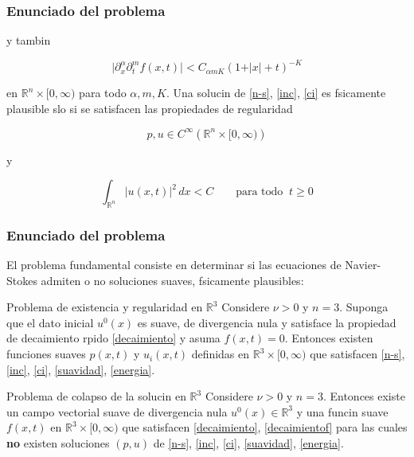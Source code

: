 \documentclass[serif,9pt]{beamer}
\begin{document}
\begin{frame}\frametitle{Enunciado del problema}
y tambin

\medskip

\begin{equation}\label{decaimientof}
\vert \partial_x^{\alpha}\partial_t^{m} f(x,t)\vert < C_{\alpha m K}\left(1 + \vert x\vert + t \right)^{-K} 
\end{equation}

\bigskip

en $\mathbb{R}^n\times [0,\infty)$ para todo $\alpha, m, K$. Una solucin de \eqref{n-s}, \eqref{inc}, \eqref{ci} es fsicamente plausible slo si se satisfacen las propiedades de regularidad

\medskip

\begin{equation}\label{suavidad}
p, u \in C^{\infty}\left(\mathbb{R}^n \times [0,\infty)\right)
\end{equation}

\medskip
y 
\medskip

\begin{equation}\label{energia}
\int_{\mathbb{R}^n} \vert u(x,t) \vert^2 \, dx < C \qquad \mbox{para todo } \ t\geq 0 
\end{equation}

\end{frame}

\begin{frame}\frametitle{Enunciado del problema}
El problema fundamental consiste en determinar si las ecuaciones de Navier-Stokes admiten o no soluciones suaves, fsicamente plausibles:

\smallskip

\begin{alertblock}{Problema de existencia y regularidad en $\mathbb{R}^3$}
Considere $\nu>0$ y $n=3$. Suponga que el dato inicial $u^0(x)$ es suave, de divergencia nula y satisface la propiedad de decaimiento rpido \eqref{decaimiento} y asuma $f(x,t)=0$. Entonces existen funciones suaves $p(x,t)$ y $u_i(x,t)$ definidas en $\mathbb{R}^3\times [0,\infty)$ que satisfacen \eqref{n-s}, \eqref{inc}, \eqref{ci}, \eqref{suavidad}, \eqref{energia}.
\end{alertblock}

\smallskip

\begin{alertblock}{Problema de colapso de la solucin en $\mathbb{R}^3$}
Considere $\nu>0$ y $n=3$. Entonces existe un campo vectorial suave de divergencia nula $u^0(x) \in \mathbb{R}^3$ y una funcin suave $f(x,t)$ en $\mathbb{R}^3\times [0,\infty)$ que satisfacen \eqref{decaimiento}, \eqref{decaimientof} para las cuales \textbf{no} existen soluciones $(p,u)$ de \eqref{n-s}, \eqref{inc}, \eqref{ci}, \eqref{suavidad}, \eqref{energia}.

\end{alertblock}

\end{frame}
\end{document}

